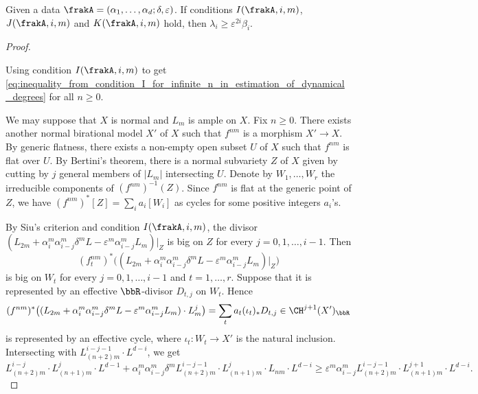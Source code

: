 \begin{theorem}\label{thm:conditions_IJK_implies_estimation_of_dynamical_degrees}
	Given a data $\frakA = (\alpha_1, \ldots, \alpha_d; \delta, \varepsilon)$.
	If conditions $I(\frakA,i,m)$, $J(\frakA,i,m)$ and $K(\frakA,i,m)$ hold, then $\lambda_i \geq \varepsilon^{2i} \beta_i$.
\end{theorem}
\begin{proof}
	\hspace{1em}
	\begin{step}
		Using condition $I(\frakA,i,m)$ to get \cref{eq:inequality_from_condition_I_for_infinite_n_in_estimation_of_dynamical_degrees} for all $n \geq 0$.
	\end{step}

	We may suppose that $X$ is normal and $L_m$ is ample on $X$.
	Fix $n \geq 0$.
	There exists another normal birational model $X'$ of $X$ such that $f^{nm}$ is a morphism $X' \to X$.
	By generic flatness, there exists a non-empty open subset $U$ of $X$ such that $f^{nm}$ is flat over $U$.
	By Bertini's theorem, there is a normal subvariety $Z$ of $X$ given by cutting by $j$ general members of $|L_m|$ intersecting $U$.
	Denote by $W_1, \ldots, W_r$ the irreducible components of $(f^{nm})^{-1}(Z)$.
	Since $f^{nm}$ is flat at the generic point of $Z$, we have $(f^{nm})^*[Z] = \sum_i a_i [W_i]$ as cycles for some positive integers $a_i$'s.

	By Siu's criterion and condition $I(\frakA,i,m)$, the divisor $(L_{2m} + \alpha_i^m \alpha_{i-j}^m \delta^m L - \varepsilon^m \alpha_{i-j}^m L_m)|_{Z}$ is big on $Z$ for every $j = 0, 1, \ldots, i-1$.
	Then
	\[ (f^{nm}_t)^*\bigl((L_{2m} + \alpha_i^m \alpha_{i-j}^m \delta^m L - \varepsilon^m \alpha_{i-j}^m L_m)|_{Z}\bigr) \]
	is big on $W_t$ for every $j = 0, 1, \ldots, i-1$ and $t = 1, \ldots, r$.
	Suppose that it is represented by an effective $\bbR$-divisor $D_{t,j}$ on $W_t$.
	Hence
	\[ (f^{nm})^*\bigl((L_{2m} + \alpha_i^m \alpha_{i-j}^m \delta^m L - \varepsilon^m \alpha_{i-j}^m L_m) \cdot L_m^{j} \bigr) = \sum_t a_t (\iota_t)_*D_{t,j} \in \CH^{j+1}(X')_\bbR \]
	is represented by an effective cycle, where $\iota_t : W_t \to X'$ is the natural inclusion.
	Intersecting with $L_{(n+2)m}^{i-j-1} \cdot L^{d-i}$, we get
	\begin{equation}\label{eq:inequality_from_condition_I_for_infinite_n_in_estimation_of_dynamical_degrees}
		L_{(n+2)m}^{i-j} \cdot L_{(n+1)m}^j \cdot L^{d-1} + \alpha_{i}^m \alpha_{i-j}^m \delta^m L_{(n+2)m}^{i-j-1} \cdot L_{(n+1)m}^{j} \cdot L_{nm} \cdot L^{d-i} \geq \varepsilon^m \alpha_{i-j}^m L_{(n+2)m}^{i-j-1} \cdot L_{(n+1)m}^{j+1} \cdot L^{d-i}.
	\end{equation}



\end{proof}
